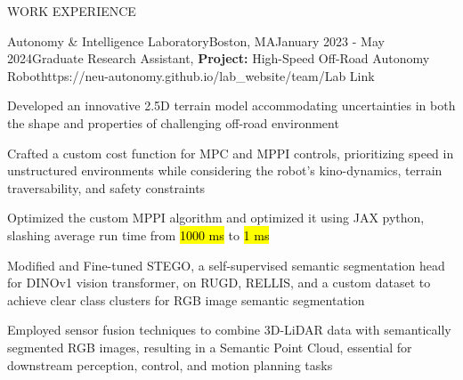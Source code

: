 \documentclass{resume} %
\begin{document}
\begin{rSection}{WORK EXPERIENCE}
	\begin{rProjExpDetails}{Autonomy \& Intelligence Laboratory}{Boston, MA}{January 2023 - May 2024}{Graduate Research Assistant, \textbf{Project:} High-Speed Off-Road Autonomy Robot}{https://neu-autonomy.github.io/lab_website/team/}{Lab Link}
		\item Developed an innovative 2.5D terrain model accommodating uncertainties in both the shape and properties of challenging off-road environment
		\item Crafted a custom cost function for MPC and MPPI controls, prioritizing speed in unstructured environments while considering the robot's kino-dynamics, terrain traversability, and safety constraints
		\item Optimized the custom MPPI algorithm and optimized it using JAX python, slashing average run time from \hl{1000 ms} to \hl{1 ms}
		\item Modified and Fine-tuned STEGO, a self-supervised semantic segmentation head for DINOv1 vision transformer, on RUGD, RELLIS, and a custom dataset to achieve clear class clusters for RGB image semantic segmentation
		\item Employed sensor fusion techniques to combine 3D-LiDAR data with semantically segmented RGB images, resulting in a Semantic Point Cloud, essential for downstream perception, control, and motion planning tasks

\end{rProjExpDetails}
\end{rSection}
\end{document}
